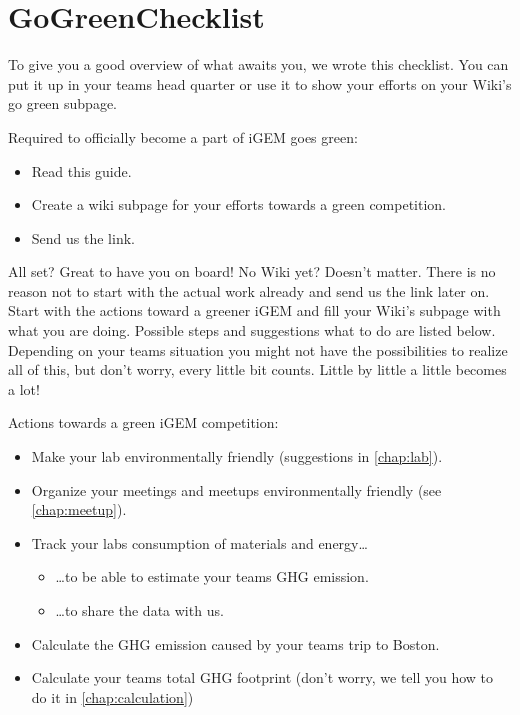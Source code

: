 \section{GoGreenChecklist}\label{checklist}
To give you a good overview of what awaits you, we wrote this checklist. You can put it up in your teams head quarter or use it to show your efforts on your Wiki's go green subpage.
\bigskip
{\renewcommand{\labelitemi}{\tickleaf}
\begin{checklistbox}
{\sffamily\textcolor{ocre}{Required to officially become a part of iGEM goes green:}}
\begin{itemize}
	\setlength{\itemsep}{-0.5\parsep}
	\item[\tickleafticked] Read this guide.
	\item Create a wiki subpage for your efforts towards a green competition.%
	\item Send us the link.
\end{itemize}
\end{checklistbox}
\bigskip
All set? Great to have you on board! No Wiki yet? Doesn't matter. There is no reason not to start with the actual work already and send us the link later on. Start with the actions toward a greener iGEM and fill your Wiki's subpage with what you are doing. Possible steps and suggestions what to do are listed below. Depending on your teams situation you might not have the possibilities to realize all of this, but don't worry, every little bit counts. Little by little a little becomes a lot!
\bigskip
\begin{checklistbox}
{\sffamily\textcolor{ocre}{Actions towards a green iGEM competition:}}
\begin{itemize}
	\setlength{\itemsep}{-0.5\parsep}
	\item Make your lab environmentally friendly (suggestions in \cref{chap:lab}).
	\item Organize your meetings and meetups environmentally friendly (see \cref{chap:meetup}).
	\item Track your labs consumption of materials and energy\dots
	\begin{itemize}
		\item[] \dots to be able to estimate your teams GHG emission.
		\item[] \dots to share the data with us.
	\end{itemize}
	\item Calculate the GHG emission caused by your teams trip to Boston.
	\item Calculate your teams total GHG footprint (don't worry, we tell you how to do it in \cref{chap:calculation})

\end{itemize}
\end{checklistbox}}
